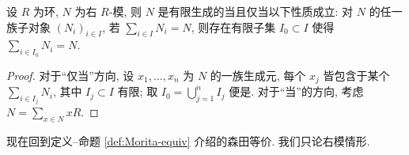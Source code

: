 \begin{lemma}\label{prop:fg-module-cat}
	设 $R$ 为环, $N$ 为右 $R$-模, 则 $N$ 是有限生成的当且仅当以下性质成立: 对 $N$ 的任一族子对象 $(N_i)_{i \in I}$, 若 $\sum_{i \in I} N_i = N$, 则存在有限子集 $I_0 \subset I$ 使得 $\sum_{i \in I_0} N_i = N$.
\end{lemma}
\begin{proof}
	对于``仅当''方向, 设 $x_1, \ldots, x_n$ 为 $N$ 的一族生成元, 每个 $x_j$ 皆包含于某个 $\sum_{i \in I_j} N_i$, 其中 $I_j \subset I$ 有限; 取 $I_0 = \bigcup_{j=1}^n I_j$ 便是. 对于``当''的方向, 考虑 $N = \sum_{x \in N} xR$.
\end{proof}

现在回到定义--命题 \ref{def:Morita-equiv} 介绍的森田等价. 我们只论右模情形.
